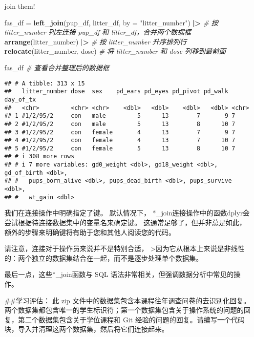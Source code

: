 \documentclass[
]{article}
\newenvironment{Shaded}{\begin{snugshade}}{\end{snugshade}}
\newcommand{\AttributeTok}[1]{\textcolor[rgb]{0.13,0.29,0.53}{#1}}
\newcommand{\CommentTok}[1]{\textcolor[rgb]{0.56,0.35,0.01}{\textit{#1}}}
\newcommand{\FunctionTok}[1]{\textcolor[rgb]{0.13,0.29,0.53}{\textbf{#1}}}
\newcommand{\NormalTok}[1]{#1}
\newcommand{\OtherTok}[1]{\textcolor[rgb]{0.56,0.35,0.01}{#1}}
\newcommand{\SpecialCharTok}[1]{\textcolor[rgb]{0.81,0.36,0.00}{\textbf{#1}}}
\newcommand{\StringTok}[1]{\textcolor[rgb]{0.31,0.60,0.02}{#1}}
\begin{document}
join them!

\begin{Shaded}
\begin{Highlighting}[]
\NormalTok{fas\_df }\OtherTok{=} 
  \FunctionTok{left\_join}\NormalTok{(pup\_df, litter\_df, }\AttributeTok{by =} \StringTok{"litter\_number"}\NormalTok{) }\SpecialCharTok{|\textgreater{}}     \CommentTok{\# 按 litter\_number 列左连接 pup\_df 和 litter\_df，合并两个数据框}
  \FunctionTok{arrange}\NormalTok{(litter\_number) }\SpecialCharTok{|\textgreater{}}                                 \CommentTok{\# 按 litter\_number 升序排列行}
  \FunctionTok{relocate}\NormalTok{(litter\_number, dose)                             }\CommentTok{\# 将 litter\_number 和 dose 列移到最前面}

\NormalTok{fas\_df                                                      }\CommentTok{\# 查看合并整理后的数据框}
\end{Highlighting}
\end{Shaded}

\begin{verbatim}
## # A tibble: 313 x 15
##   litter_number dose  sex    pd_ears pd_eyes pd_pivot pd_walk day_of_tx
##   <chr>         <chr> <chr>    <dbl>   <dbl>    <dbl>   <dbl> <chr>    
## 1 #1/2/95/2     con   male         5      13        7       9 7        
## 2 #1/2/95/2     con   male         5      13        8      10 7        
## 3 #1/2/95/2     con   female       4      13        7       9 7        
## 4 #1/2/95/2     con   female       4      13        7      10 7        
## 5 #1/2/95/2     con   female       5      13        8      10 7        
## # i 308 more rows
## # i 7 more variables: gd0_weight <dbl>, gd18_weight <dbl>, gd_of_birth <dbl>,
## #   pups_born_alive <dbl>, pups_dead_birth <dbl>, pups_survive <dbl>,
## #   wt_gain <dbl>
\end{verbatim}

我们在连接操作中明确指定了键。 默认情况下，
*\_join连接操作中的函数dplyr会尝试根据待连接数据集中的变量名来确定键。
这通常足够了，但并非总是如此，额外的步骤来明确键将有助于您和其他人阅读您的代码。

请注意，连接对于操作员来说并不是特别合适，
\textbar\textgreater 因为它从根本上来说是非线性的：两个独立的数据集结合在一起，而不是逐步处理单个数据集。

最后一点，这些*\_join函数与 SQL
语法非常相关，但强调数据分析中常见的操作。

\#\#学习评估： 此 zip
文件中的数据集包含本课程往年调查问卷的去识别化回复。两个数据集都包含唯一的学生标识符；第一个数据集包含关于操作系统的问题的回复，第二个数据集包含关于学位课程和
Git
经验的问题的回复。请编写一个代码块，导入并清理这两个数据集，然后将它们连接起来。
\end{document}
